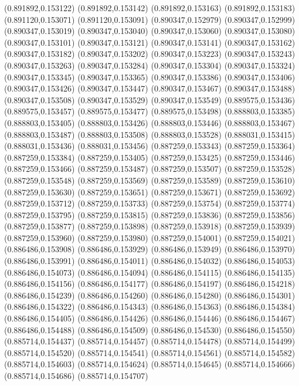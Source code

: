 (0.891892,0.153122)
(0.891892,0.153142)
(0.891892,0.153163)
(0.891892,0.153183)
(0.891120,0.153071)
(0.891120,0.153091)
(0.890347,0.152979)
(0.890347,0.152999)
(0.890347,0.153019)
(0.890347,0.153040)
(0.890347,0.153060)
(0.890347,0.153080)
(0.890347,0.153101)
(0.890347,0.153121)
(0.890347,0.153141)
(0.890347,0.153162)
(0.890347,0.153182)
(0.890347,0.153202)
(0.890347,0.153223)
(0.890347,0.153243)
(0.890347,0.153263)
(0.890347,0.153284)
(0.890347,0.153304)
(0.890347,0.153324)
(0.890347,0.153345)
(0.890347,0.153365)
(0.890347,0.153386)
(0.890347,0.153406)
(0.890347,0.153426)
(0.890347,0.153447)
(0.890347,0.153467)
(0.890347,0.153488)
(0.890347,0.153508)
(0.890347,0.153529)
(0.890347,0.153549)
(0.889575,0.153436)
(0.889575,0.153457)
(0.889575,0.153477)
(0.889575,0.153498)
(0.888803,0.153385)
(0.888803,0.153405)
(0.888803,0.153426)
(0.888803,0.153446)
(0.888803,0.153467)
(0.888803,0.153487)
(0.888803,0.153508)
(0.888803,0.153528)
(0.888031,0.153415)
(0.888031,0.153436)
(0.888031,0.153456)
(0.887259,0.153343)
(0.887259,0.153364)
(0.887259,0.153384)
(0.887259,0.153405)
(0.887259,0.153425)
(0.887259,0.153446)
(0.887259,0.153466)
(0.887259,0.153487)
(0.887259,0.153507)
(0.887259,0.153528)
(0.887259,0.153548)
(0.887259,0.153569)
(0.887259,0.153589)
(0.887259,0.153610)
(0.887259,0.153630)
(0.887259,0.153651)
(0.887259,0.153671)
(0.887259,0.153692)
(0.887259,0.153712)
(0.887259,0.153733)
(0.887259,0.153754)
(0.887259,0.153774)
(0.887259,0.153795)
(0.887259,0.153815)
(0.887259,0.153836)
(0.887259,0.153856)
(0.887259,0.153877)
(0.887259,0.153898)
(0.887259,0.153918)
(0.887259,0.153939)
(0.887259,0.153960)
(0.887259,0.153980)
(0.887259,0.154001)
(0.887259,0.154021)
(0.886486,0.153908)
(0.886486,0.153929)
(0.886486,0.153949)
(0.886486,0.153970)
(0.886486,0.153991)
(0.886486,0.154011)
(0.886486,0.154032)
(0.886486,0.154053)
(0.886486,0.154073)
(0.886486,0.154094)
(0.886486,0.154115)
(0.886486,0.154135)
(0.886486,0.154156)
(0.886486,0.154177)
(0.886486,0.154197)
(0.886486,0.154218)
(0.886486,0.154239)
(0.886486,0.154260)
(0.886486,0.154280)
(0.886486,0.154301)
(0.886486,0.154322)
(0.886486,0.154343)
(0.886486,0.154363)
(0.886486,0.154384)
(0.886486,0.154405)
(0.886486,0.154426)
(0.886486,0.154446)
(0.886486,0.154467)
(0.886486,0.154488)
(0.886486,0.154509)
(0.886486,0.154530)
(0.886486,0.154550)
(0.885714,0.154437)
(0.885714,0.154457)
(0.885714,0.154478)
(0.885714,0.154499)
(0.885714,0.154520)
(0.885714,0.154541)
(0.885714,0.154561)
(0.885714,0.154582)
(0.885714,0.154603)
(0.885714,0.154624)
(0.885714,0.154645)
(0.885714,0.154666)
(0.885714,0.154686)
(0.885714,0.154707)

